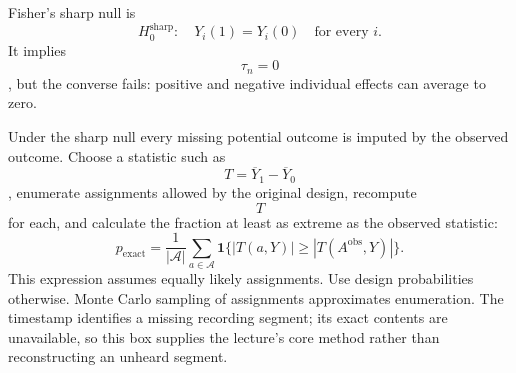 Fisher's sharp null is
\begin{equation}
H_0^{\mathrm{sharp}}:\quad Y_i(1)=Y_i(0)\quad\text{for every }i.
\end{equation}
It implies $$\tau_n=0$$, but the converse fails: positive and negative individual effects can average to zero.
\begin{todo}
Under the sharp null every missing potential outcome is imputed by the observed outcome. Choose a statistic such as $$T=\overline Y_1-\overline Y_0$$, enumerate assignments allowed by the original design, recompute $$T$$ for each, and calculate the fraction at least as extreme as the observed statistic:
\begin{equation}
p_{\mathrm{exact}}=\frac{1}{|\mathcal A|}\sum_{a\in\mathcal A}
\mathbf1\{|T(a,Y)|\geq|T(A^{\mathrm{obs}},Y)|\}.
\end{equation}
This expression assumes equally likely assignments. Use design probabilities otherwise. Monte Carlo sampling of assignments approximates enumeration. The timestamp identifies a missing recording segment; its exact contents are unavailable, so this box supplies the lecture's core method rather than reconstructing an unheard segment.
\end{todo}

